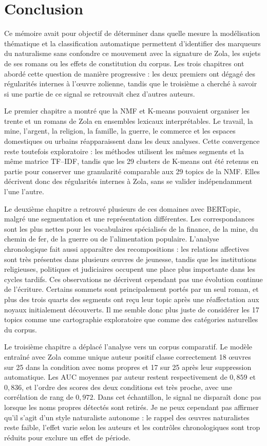\chapter*{Conclusion}

Ce mémoire avait pour objectif de déterminer dans quelle mesure la modélisation thématique et la classification automatique permettent d'identifier des marqueurs du naturalisme sans confondre ce mouvement avec la signature de Zola, les sujets de ses romans ou les effets de constitution du corpus. Les trois chapitres ont abordé cette question de manière progressive : les deux premiers ont dégagé des régularités internes à l'œuvre zolienne, tandis que le troisième a cherché à savoir si une partie de ce signal se retrouvait chez d'autres auteurs.

Le premier chapitre a montré que la NMF et K-means pouvaient organiser les trente et un romans de Zola en ensembles lexicaux interprétables. Le travail, la mine, l'argent, la religion, la famille, la guerre, le commerce et les espaces domestiques ou urbains réapparaissent dans les deux analyses. Cette convergence reste toutefois exploratoire : les méthodes utilisent les mêmes segments et la même matrice TF--IDF, tandis que les 29 clusters de K-means ont été retenus en partie pour conserver une granularité comparable aux 29 topics de la NMF. Elles décrivent donc des régularités internes à Zola, sans se valider indépendamment l'une l'autre.

Le deuxième chapitre a retrouvé plusieurs de ces domaines avec BERTopic, malgré une segmentation et une représentation différentes. Les correspondances sont les plus nettes pour les vocabulaires spécialisés de la finance, de la mine, du chemin de fer, de la guerre ou de l'alimentation populaire. L'analyse chronologique fait aussi apparaître des recompositions : les relations affectives sont très présentes dans plusieurs œuvres de jeunesse, tandis que les institutions religieuses, politiques et judiciaires occupent une place plus importante dans les cycles tardifs. Ces observations ne décrivent cependant pas une évolution continue de l'écriture. Certains sommets sont principalement portés par un seul roman, et plus des trois quarts des segments ont reçu leur topic après une réaffectation aux noyaux initialement découverts. Il me semble donc plus juste de considérer les 17 topics comme une cartographie exploratoire que comme des catégories naturelles du corpus.

Le troisième chapitre a déplacé l'analyse vers un corpus comparatif. Le modèle entraîné avec Zola comme unique auteur positif classe correctement 18 œuvres sur 25 dans la condition avec noms propres et 17 sur 25 après leur suppression automatique. Les AUC moyennes par auteur restent respectivement de $0{,}859$ et $0{,}836$, et l'ordre des scores des deux conditions est très proche, avec une corrélation de rang de $0{,}972$. Dans cet échantillon, le signal ne disparaît donc pas lorsque les noms propres détectés sont retirés. Je ne peux cependant pas affirmer qu'il s'agit d'un style naturaliste autonome : le rappel des œuvres naturalistes reste faible, l'effet varie selon les auteurs et les contrôles chronologiques sont trop réduits pour exclure un effet de période.

